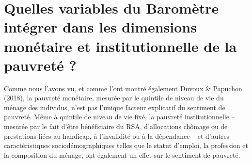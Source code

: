 \documentclass[12pt,a4paper]{reedthesis}
\begin{document}
\hypertarget{quelles-variables-du-baromuxe8tre-intuxe9grer-dans-les-dimensions-monuxe9taire-et-institutionnelle-de-la-pauvretuxe9}{%
\section{Quelles variables du Baromètre intégrer dans les dimensions monétaire et institutionnelle de la pauvreté ?}\label{quelles-variables-du-baromuxe8tre-intuxe9grer-dans-les-dimensions-monuxe9taire-et-institutionnelle-de-la-pauvretuxe9}}

Comme nous l'avons vu, et comme l'ont montré également Duvoux \& Papuchon (2018), la pauvreté monétaire, mesurée par le quintile de niveau de vie du ménage des individus, n'est pas l'unique facteur explicatif du sentiment de pauvreté. Même à quintile de niveau de vie fixé, la pauvreté institutionnelle -- mesurée par le fait d'être bénéficiaire du RSA, d'allocations chômage ou de prestations liées au handicap, à l'invalidité ou à la dépendance -- et d'autres caractéristiques sociodémographiques telles que le statut d'emploi, la profession et la composition du ménage, ont également un effet sur le sentiment de pauvreté.
\end{document}
